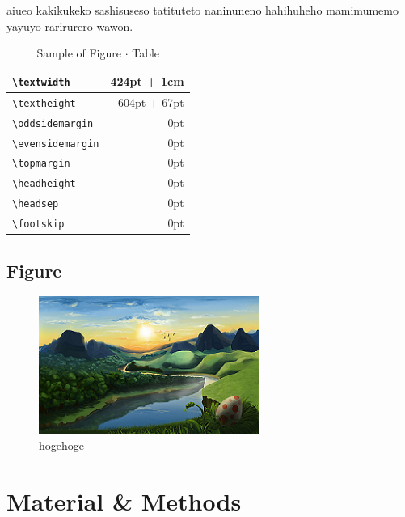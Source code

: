 \documentclass[
  ams,
  uplatex]{U-AizuGT}
\begin{document}
    aiueo kakikukeko sashisuseso tatituteto naninuneno hahihuheho mamimumemo
    yayuyo rarirurero wawon.

    \begin{table}[htbp]
      \caption{Sample of Figure $\cdot$ Table}\label{tab:fig}
      \begin{center}
        \begin{tabular}{|l|r|}
          \hline
          \verb+\textwidth+ & 424pt + 1cm  \\ \hline
          \verb+\textheight+ & 604pt + 67pt \\ \hline
          \verb+\oddsidemargin+ & 0pt          \\ \hline
          \verb+\evensidemargin+ & 0pt          \\ \hline
          \verb+\topmargin+ & 0pt          \\ \hline
          \verb+\headheight+ & 0pt          \\ \hline
          \verb+\headsep+ & 0pt          \\ \hline
          \verb+\footskip+ & 0pt          \\ \hline
        \end{tabular}
      \end{center}
    \end{table}

    \hypertarget{figure}{%
    \subsection{Figure}\label{figure}}

    \begin{figure}[htbp]
      \centering
      \includegraphics[scale = 1.0]{image.png}
      \caption{hogehoge}\label{fig:hogehoge}
    \end{figure}

    \hypertarget{material-methods}{%
    \section{Material \& Methods}\label{material-methods}}
\end{document}
